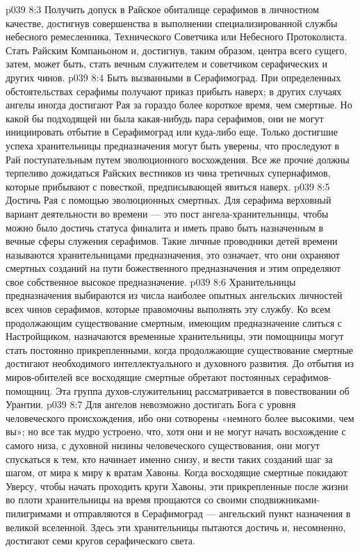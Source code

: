 \vs p039 8:3 \bibnobreakspace Получить допуск в Райское обиталище серафимов в личностном качестве, достигнув совершенства в выполнении специализированной службы небесного ремесленника, Технического Советчика или Небесного Протоколиста. Стать Райским Компаньоном и, достигнув, таким образом, центра всего сущего, затем, может быть, стать вечным служителем и советчиком серафических и других чинов.
\vs p039 8:4 \bibnobreakspace Быть вызванными в Серафимоград. При определенных обстоятельствах серафимы получают приказ прибыть наверх; в других случаях ангелы иногда достигают Рая за гораздо более короткое время, чем смертные. Но какой бы подходящей ни была какая\hyp{}нибудь пара серафимов, они не могут инициировать отбытие в Серафимоград или куда\hyp{}либо еще. Только достигшие успеха хранительницы предназначения могут быть уверены, что проследуют в Рай поступательным путем эволюционного восхождения. Все же прочие должны терпеливо дожидаться Райских вестников из чина третичных супернафимов, которые прибывают с повесткой, предписывающей явиться наверх.
\vs p039 8:5 \bibnobreakspace Достичь Рая с помощью эволюционных смертных. Для серафима верховный вариант деятельности во времени --- это пост ангела\hyp{}хранительницы, чтобы можно было достичь статуса финалита и иметь право быть назначенным в вечные сферы служения серафимов. Такие личные проводники детей времени называются хранительницами предназначения, это означает, что они охраняют смертных созданий на пути божественного предназначения и этим определяют свое собственное высокое предназначение.
\vs p039 8:6 Хранительницы предназначения выбираются из числа наиболее опытных ангельских личностей всех чинов серафимов, которые правомочны выполнять эту службу. Ко всем продолжающим существование смертным, имеющим предназначение слиться с Настройщиком, назначаются временные хранительницы, эти помощницы могут стать постоянно прикрепленными, когда продолжающие существование смертные достигают необходимого интеллектуального и духовного развития. До отбытия из миров\hyp{}обителей все восходящие смертные обретают постоянных серафимов\hyp{}помощниц. Эта группа духов\hyp{}служительниц рассматривается в повествовании об Урантии.
\vs p039 8:7 \pc Для ангелов невозможно достигать Бога с уровня человеческого происхождения, ибо они сотворены «немного более высокими, чем вы»; но все так мудро устроено, что, хотя они и не могут начать восхождение с самого низа, с духовной низины человеческого существования, они могут спускаться к тем, кто начинает именно снизу, и вести таких созданий шаг за шагом, от мира к миру к вратам Хавоны. Когда восходящие смертные покидают Уверсу, чтобы начать проходить круги Хавоны, эти прикрепленные после жизни во плоти хранительницы на время прощаются со своими сподвижниками\hyp{}пилигримами и отправляются в Серафимоград --- ангельский пункт назначения в великой вселенной. Здесь эти хранительницы пытаются достичь и, несомненно, достигают семи кругов серафического света.
